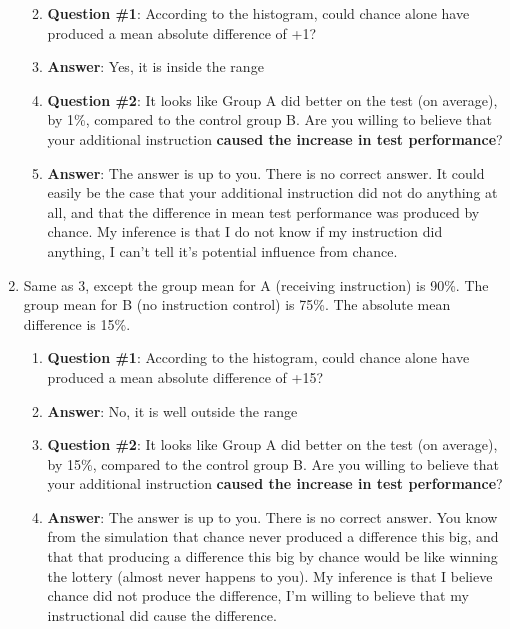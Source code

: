 \documentclass[]{book}
\providecommand{\tightlist}{%
  \setlength{\itemsep}{0pt}\setlength{\parskip}{0pt}}
\theoremstyle{definition}
\theoremstyle{definition}
\theoremstyle{definition}
\theoremstyle{remark}
\begin{document}
\begin{enumerate}
  \begin{enumerate}
  \def\labelenumii{\alph{enumii}.}
  \tightlist
  \item
    \textbf{Question \#1}: According to the histogram, could chance
    alone have produced a mean absolute difference of +1?
  \item
    \textbf{Answer}: Yes, it is inside the range
  \item
    \textbf{Question \#2}: It looks like Group A did better on the test
    (on average), by 1\%, compared to the control group B. Are you
    willing to believe that your additional instruction \textbf{caused
    the increase in test performance}?
  \item
    \textbf{Answer}: The answer is up to you. There is no correct
    answer. It could easily be the case that your additional instruction
    did not do anything at all, and that the difference in mean test
    performance was produced by chance. My inference is that I do not
    know if my instruction did anything, I can't tell it's potential
    influence from chance.
  \end{enumerate}
\item
  Same as 3, except the group mean for A (receiving instruction) is
  90\%. The group mean for B (no instruction control) is 75\%. The
  absolute mean difference is 15\%.

  \begin{enumerate}
  \def\labelenumii{\alph{enumii}.}
  \tightlist
  \item
    \textbf{Question \#1}: According to the histogram, could chance
    alone have produced a mean absolute difference of +15?
  \item
    \textbf{Answer}: No, it is well outside the range
  \item
    \textbf{Question \#2}: It looks like Group A did better on the test
    (on average), by 15\%, compared to the control group B. Are you
    willing to believe that your additional instruction \textbf{caused
    the increase in test performance}?
  \item
    \textbf{Answer}: The answer is up to you. There is no correct
    answer. You know from the simulation that chance never produced a
    difference this big, and that that producing a difference this big
    by chance would be like winning the lottery (almost never happens to
    you). My inference is that I believe chance did not produce the
    difference, I'm willing to believe that my instructional did cause
    the difference.
  \end{enumerate}
\end{enumerate}
\end{document}
